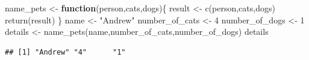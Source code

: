 \documentclass[]{article}
\newenvironment{Shaded}{\begin{snugshade}}{\end{snugshade}}
\newcommand{\ControlFlowTok}[1]{\textcolor[rgb]{0.13,0.29,0.53}{\textbf{#1}}}
\newcommand{\DecValTok}[1]{\textcolor[rgb]{0.00,0.00,0.81}{#1}}
\newcommand{\FunctionTok}[1]{\textcolor[rgb]{0.00,0.00,0.00}{#1}}
\newcommand{\NormalTok}[1]{#1}
\newcommand{\OtherTok}[1]{\textcolor[rgb]{0.56,0.35,0.01}{#1}}
\newcommand{\StringTok}[1]{\textcolor[rgb]{0.31,0.60,0.02}{#1}}
\begin{document}
\begin{Shaded}
\begin{Highlighting}[]
\NormalTok{name\_pets }\OtherTok{\textless{}{-}} \ControlFlowTok{function}\NormalTok{(person,cats,dogs)\{}
\NormalTok{  result }\OtherTok{\textless{}{-}} \FunctionTok{c}\NormalTok{(person,cats,dogs)}
  \FunctionTok{return}\NormalTok{(result)}
\NormalTok{\}}
\NormalTok{name }\OtherTok{\textless{}{-}} \StringTok{"Andrew"}
\NormalTok{number\_of\_cats }\OtherTok{\textless{}{-}} \DecValTok{4}
\NormalTok{number\_of\_dogs }\OtherTok{\textless{}{-}} \DecValTok{1}
\NormalTok{details }\OtherTok{\textless{}{-}} \FunctionTok{name\_pets}\NormalTok{(name,number\_of\_cats,number\_of\_dogs)}
\NormalTok{details}
\end{Highlighting}
\end{Shaded}

\begin{verbatim}
## [1] "Andrew" "4"      "1"
\end{verbatim}
\end{document}
